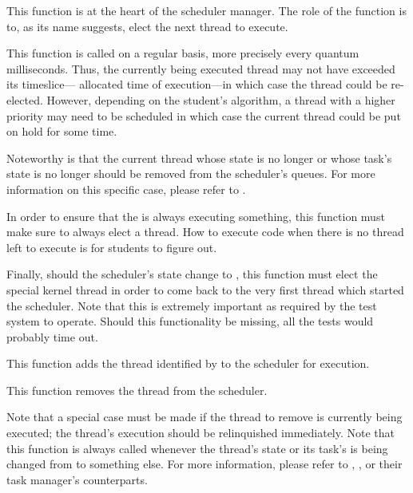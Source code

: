          {
           This function is at the heart of the scheduler manager. The role
           of the  function is to, as its name
           suggests, elect the next thread to execute.

           \-

           This function is called on a regular basis, more precisely
           every quantum milliseconds. Thus, the currently being executed
           thread may not have exceeded its timeslice---\ie{} allocated time
           of execution---in which case the thread could be re-elected.
           However, depending on the student's algorithm, a thread with a
           higher priority may need to be scheduled in which case the current
           thread could be put on hold for some time.

           \-

           Noteworthy is that the current thread whose state is no longer
            or whose task's state is no longer
            should be removed from the scheduler's queues.
           For more information on this specific case, please refer to
           .

           \-

           In order to ensure that the  is always executing
           something, this function must make sure to always elect a thread.
           How to execute code when there is no thread left to execute
           is for students to figure out.

           \-

           Finally, should the scheduler's state change to
           , this function must elect the special
           kernel thread \ie{}  in order to come back
           to the very first thread which started the scheduler. Note that
           this is extremely important as required by the test system to
           operate. Should this functionality be missing, all the tests
           would probably time out.
         }

         {
           This function adds the thread identified by  to
           the scheduler for execution.
         }

         {
           This function removes the thread  from the scheduler.

           \-

           Note that a special case must be made if the thread to remove
           is currently being executed; the thread's execution should be
           relinquished immediately. Note that this function is always
           called whenever the thread's state or its task's is being changed
           from  to something else. For more information, please
           refer to , ,
            or their task manager's counterparts.
         }

